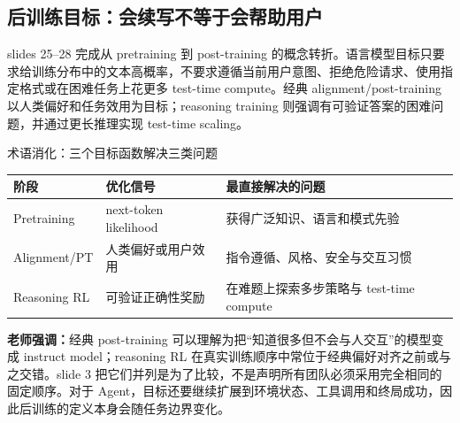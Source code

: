 \subsection{后训练目标：会续写不等于会帮助用户}

slides 25--28 完成从 pretraining 到 post-training 的概念转折。语言模型目标只要求给训练分布中的文本高概率，不要求遵循当前用户意图、拒绝危险请求、使用指定格式或在困难任务上花更多 test-time compute。经典 alignment/post-training 以人类偏好和任务效用为目标；reasoning training 则强调有可验证答案的困难问题，并通过更长推理实现 test-time scaling。


\begin{knowledgebox}{术语消化：三个目标函数解决三类问题}
\begin{tabular}{p{2.5cm}p{4.2cm}p{4.5cm}}
\toprule
\textbf{阶段} & \textbf{优化信号} & \textbf{最直接解决的问题} \\
\midrule
Pretraining & next-token likelihood & 获得广泛知识、语言和模式先验 \\
Alignment/PT & 人类偏好或用户效用 & 指令遵循、风格、安全与交互习惯 \\
Reasoning RL & 可验证正确性奖励 & 在难题上探索多步策略与 test-time compute \\
\bottomrule
\end{tabular}
\end{knowledgebox}

\textbf{老师强调：}经典 post-training 可以理解为把“知道很多但不会与人交互”的模型变成 instruct model；reasoning RL 在真实训练顺序中常位于经典偏好对齐之前或与之交错。slide 3 把它们并列是为了比较，不是声明所有团队必须采用完全相同的固定顺序。对于 Agent，目标还要继续扩展到环境状态、工具调用和终局成功，因此后训练的定义本身会随任务边界变化。

